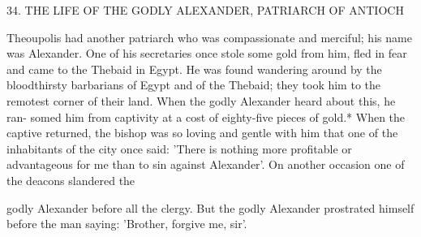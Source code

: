 34.
THE LIFE OF THE GODLY ALEXANDER,
PATRIARCH OF ANTIOCH

Theoupolis had another patriarch who was compassionate and
merciful; his name was Alexander.
One of his secretaries once stole
some gold from him, fled in fear and came to the Thebaid in Egypt.
He was found wandering around by the bloodthirsty barbarians of
Egypt and of the Thebaid; they took him to the remotest corner of
their land.
When the godly Alexander heard about this, he ran-
somed him from captivity at a cost of eighty-five pieces of gold.*
When the captive returned, the bishop was so loving and gentle with
him that one of the inhabitants of the city once said: 'There is
nothing more profitable or advantageous for me than to sin against
Alexander'.
On another occasion one of the deacons slandered the

godly Alexander before all the clergy.
But the godly Alexander
prostrated himself before the man saying: 'Brother, forgive me, sir'.

